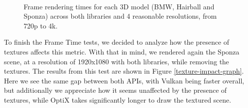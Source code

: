 \begin{figure}
    \\
    \centering
    \caption{Frame rendering times for each 3D model (BMW, Hairball and Sponza) across both libraries and 4 reasonable resolutions, from 720p to 4k.}
    \label{frametimes-overview-graph}
\end{figure}

To finish the Frame Time tests, we decided to analyze how the presence of textures affects this metric. With that in mind, we rendered again the Sponza scene, at a resolution of 1920x1080 with both libraries, while removing the textures. The results from this test are shown in Figure \ref{texture-impact-graph}. Here we see the same gap between both APIs, with Vulkan being faster overall, but additionally we appreciate how it seems unaffected by the presence of textures, while OptiX takes significantly longer to draw the textured scene.

